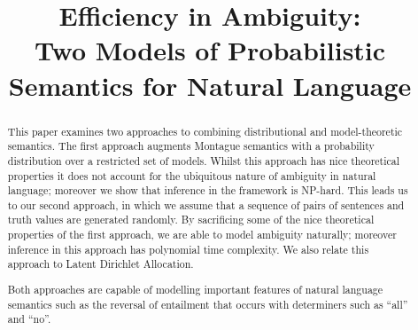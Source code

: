 \documentclass[11pt]{article}
\title{Efficiency in Ambiguity:\\ Two Models of Probabilistic Semantics for Natural Language}
\author{}
\date{}
\theoremstyle{definition}
\begin{document}
\maketitle
\begin{abstract}
  This paper examines two approaches to combining distributional and
  model-theoretic semantics. The first approach augments Montague
  semantics with a probability distribution over a restricted set of
  models. Whilst this approach has nice theoretical properties it does
  not account for the ubiquitous nature of ambiguity in natural
  language; moreover we show that inference in the framework is
  NP-hard. This leads us to our second approach, in which we assume
  that a sequence of pairs of sentences and truth values are generated
  randomly. By sacrificing some of the nice theoretical properties of
  the first approach, we are able to model ambiguity naturally;
  moreover inference in this approach has polynomial time
  complexity. We also relate this approach to Latent Dirichlet
  Allocation.

  Both approaches are capable of modelling important features of
  natural language semantics such as the reversal of entailment that
  occurs with determiners such as ``all'' and ``no''.
\end{abstract}



\end{document}
